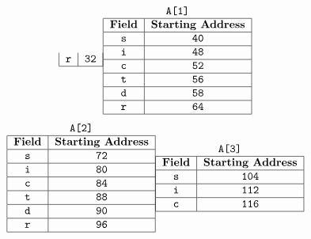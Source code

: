 \documentclass[9pt]{article}
\begin{document}
\begin{enumerate}
\begin{enumerate}
$$\begin{tabular}{@{}|c|c|@{}}
                     \verb|r| & \verb|32| \\ \hline
                  \end{tabular}
                  \begin{tabular}{@{}|c|c|@{}}
                     \multicolumn{2}{c}{\texttt{A[1]}} \\ \hline
                     \textbf{Field} & \textbf{Starting Address} \\ \hline
                     \verb|s| & \verb|40| \\ \hline
                     \verb|i| & \verb|48| \\ \hline
                     \verb|c| & \verb|52| \\ \hline
                     \verb|t| & \verb|56| \\ \hline
                     \verb|d| & \verb|58| \\ \hline
                     \verb|r| & \verb|64| \\ \hline
                  \end{tabular}
               $$
               $$
                  \begin{tabular}{@{}|c|c|@{}}
                     \multicolumn{2}{c}{\texttt{A[2]}} \\ \hline
                     \textbf{Field} & \textbf{Starting Address} \\ \hline
                     \verb|s| & \verb|72| \\ \hline
                     \verb|i| & \verb|80| \\ \hline
                     \verb|c| & \verb|84| \\ \hline
                     \verb|t| & \verb|88| \\ \hline
                     \verb|d| & \verb|90| \\ \hline
                     \verb|r| & \verb|96| \\ \hline
                  \end{tabular}
                  \begin{tabular}{@{}|c|c|@{}}
                     \multicolumn{2}{c}{\texttt{A[3]}} \\ \hline
                     \textbf{Field} & \textbf{Starting Address} \\ \hline
                     \verb|s| & \verb|104| \\ \hline
                     \verb|i| & \verb|112| \\ \hline
                     \verb|c| & \verb|116| \\ \hline

\end{tabular}$$
\end{enumerate}
\end{enumerate}
\end{document}
